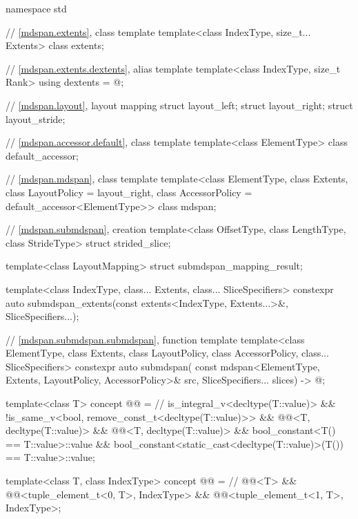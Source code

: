 %
\begin{codeblock}
namespace std {
  // \ref{mdspan.extents}, class template 
  template<class IndexType, size_t... Extents>
    class extents;

  // \ref{mdspan.extents.dextents}, alias template 
  template<class IndexType, size_t Rank>
    using dextents = @\seebelow@;

  // \ref{mdspan.layout}, layout mapping
  struct layout_left;
  struct layout_right;
  struct layout_stride;

  // \ref{mdspan.accessor.default}, class template 
  template<class ElementType>
    class default_accessor;

  // \ref{mdspan.mdspan}, class template 
  template<class ElementType, class Extents, class LayoutPolicy = layout_right,
           class AccessorPolicy = default_accessor<ElementType>>
    class mdspan;

  // \ref{mdspan.submdspan},  creation
  template<class OffsetType, class LengthType, class StrideType>
    struct strided_slice;

  template<class LayoutMapping>
    struct submdspan_mapping_result;

  template<class IndexType, class... Extents, class... SliceSpecifiers>
    constexpr auto submdspan_extents(const extents<IndexType, Extents...>&, SliceSpecifiers...);

  // \ref{mdspan.submdspan.submdspan},  function template
  template<class ElementType, class Extents, class LayoutPolicy,
           class AccessorPolicy, class... SliceSpecifiers>
    constexpr auto submdspan(
      const mdspan<ElementType, Extents, LayoutPolicy, AccessorPolicy>& src,
      SliceSpecifiers... slices) -> @\seebelow@;

  template<class T>
    concept @@ =        // \expos
      is_integral_v<decltype(T::value)> &&
      !is_same_v<bool, remove_const_t<decltype(T::value)>> &&
      @@<T, decltype(T::value)> &&
      @@<T, decltype(T::value)> &&
      bool_constant<T() == T::value>::value &&
      bool_constant<static_cast<decltype(T::value)>(T()) == T::value>::value;

  template<class T, class IndexType>
    concept @@ =               // \expos
      @@<T> &&
      @@<tuple_element_t<0, T>, IndexType> &&
      @@<tuple_element_t<1, T>, IndexType>;
}
\end{codeblock}

